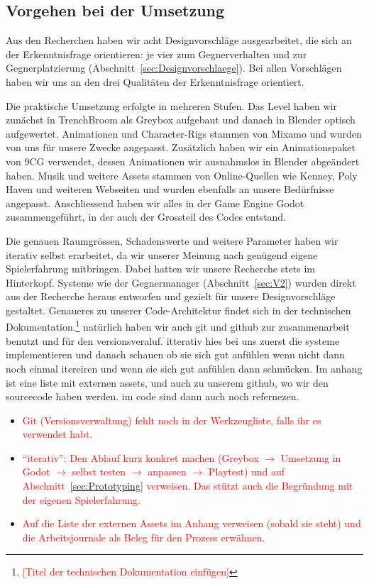 \documentclass[../Main.tex]{subfiles}
\begin{document}
\subsection{Vorgehen bei der Umsetzung} \label{sec:VorgehenUmsetzung}
Aus den Recherchen haben wir acht Designvorschläge ausgearbeitet, die sich an der Erkenntnisfrage orientieren: je vier zum Gegnerverhalten und zur Gegnerplatzierung (Abschnitt~\ref{sec:Designvorschlaege}). Bei allen Vorschlägen haben wir uns an den drei Qualitäten der Erkenntnisfrage orientiert.

Die praktische Umsetzung erfolgte in mehreren Stufen. Das Level haben wir zunächst in TrenchBroom als Greybox aufgebaut und danach in Blender optisch aufgewertet. Animationen und Character-Rigs stammen von Mixamo und wurden von uns für unsere Zwecke angepasst. Zusätzlich haben wir ein Animationspaket von 9CG verwendet, dessen Animationen wir ausnahmslos in Blender abgeändert haben. Musik und weitere Assets stammen von Online-Quellen wie Kenney, Poly Haven und weiteren Webseiten und wurden ebenfalls an unsere Bedürfnisse angepasst. Anschliessend haben wir alles in der Game Engine Godot zusammengeführt, in der auch der Grossteil des Codes entstand.

Die genauen Raumgrössen, Schadenswerte und weitere Parameter haben wir iterativ selbst erarbeitet, da wir unserer Meinung nach genügend eigene Spielerfahrung mitbringen. Dabei hatten wir unsere Recherche stets im Hinterkopf. Systeme wie der Gegnermanager (Abschnitt~\ref{sec:V2}) wurden direkt aus der Recherche heraus entworfen und gezielt für unsere Designvorschläge gestaltet. Genaueres zu unserer Code-Architektur findet sich in der technischen Dokumentation.\footnote{\textcolor{red}{[Titel der technischen Dokumentation einfügen]}} natürlich haben wir auch git und github zur zusammenarbeit benutzt und für den versionsveraluf. itterativ hies bei uns zuerst die systeme implementieren und danach schauen ob sie sich gut anfühlen wenn nicht dann noch einmal itereiren und wenn sie sich gut anfühlen dann schmücken. Im anhang ist eine liste mit externen assets, und auch zu unserem github, wo wir den sourcecode haben werden. im code sind dann auch noch refernezen.

\begin{itemize}[leftmargin=1.5cm]
    \item \textcolor{red}{Git (Versionsverwaltung) fehlt noch in der Werkzeugliste, falls ihr es verwendet habt.}
    \item \textcolor{red}{\enquote{iterativ}: Den Ablauf kurz konkret machen (Greybox $\rightarrow$ Umsetzung in Godot $\rightarrow$ selbst testen $\rightarrow$ anpassen $\rightarrow$ Playtest) und auf Abschnitt~\ref{sec:Prototyping} verweisen. Das stützt auch die Begründung mit der eigenen Spielerfahrung.}
    \item \textcolor{red}{Auf die Liste der externen Assets im Anhang verweisen (sobald sie steht) und die Arbeitsjournale als Beleg für den Prozess erwähnen.}
\end{itemize}
\end{document}
